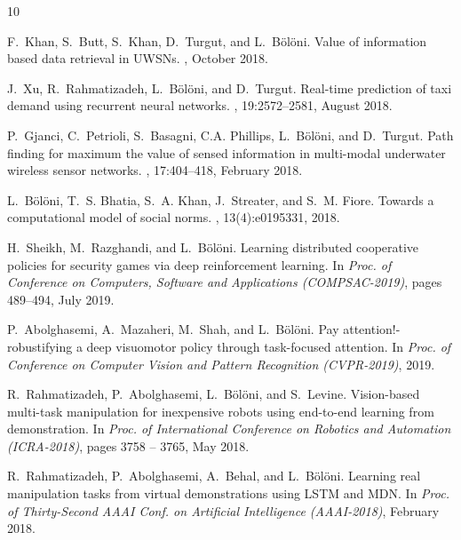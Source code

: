 \begin{thebibliography}{10}

\small

  F.~Khan, S.~Butt, S.~Khan, D.~Turgut, and L.~B{\"o}l{\"o}ni.
  \newblock Value of information based data retrieval in {UWSN}s.
  , October 2018.

  J.~Xu, R.~Rahmatizadeh, L.~B{\"o}l{\"o}ni, and D.~Turgut.
  \newblock Real-time prediction of taxi demand using recurrent neural networks.
  ,
    19:2572--2581, August 2018.

  P.~Gjanci, C.~Petrioli, S.~Basagni, C.A. Phillips, L.~B{\"o}l{\"o}ni, and
    D.~Turgut.
  \newblock Path finding for maximum the value of sensed information in
    multi-modal underwater wireless sensor networks.
  , 17:404--418, February
    2018.

  L.~B{\"o}l{\"o}ni, T.~S. Bhatia, S.~A. Khan, J.~Streater, and S.~M. Fiore.
  \newblock Towards a computational model of social norms.
  , 13(4):e0195331, 2018.

  H.~Sheikh, M.~Razghandi, and L.~B{\"o}l{\"o}ni.
  \newblock Learning distributed cooperative policies for security games via deep
    reinforcement learning.
  \newblock In {\em Proc. of Conference on Computers, Software and Applications
    (COMPSAC-2019)}, pages 489--494, July 2019.

    P.~Abolghasemi, A.~Mazaheri, M.~Shah, and L.~B{\"o}l{\"o}ni.
    \newblock Pay attention!-robustifying a deep visuomotor policy through
      task-focused attention.
    \newblock In {\em Proc. of Conference on Computer Vision and Pattern
      Recognition (CVPR-2019)}, 2019.

      R.~Rahmatizadeh, P.~Abolghasemi, L.~B{\"o}l{\"o}ni, and S.~Levine.
      \newblock Vision-based multi-task manipulation for inexpensive robots using
        end-to-end learning from demonstration.
      \newblock In {\em Proc. of International Conference on Robotics and Automation
        (ICRA-2018)}, pages 3758 -- 3765, May 2018.

        R.~Rahmatizadeh, P.~Abolghasemi, A.~Behal, and L.~B{\"o}l{\"o}ni.
        \newblock Learning real manipulation tasks from virtual demonstrations using
          {LSTM} and {MDN}.
        \newblock In {\em Proc. of Thirty-Second AAAI Conf. on Artificial Intelligence
          (AAAI-2018)}, February 2018.


\end{thebibliography}
